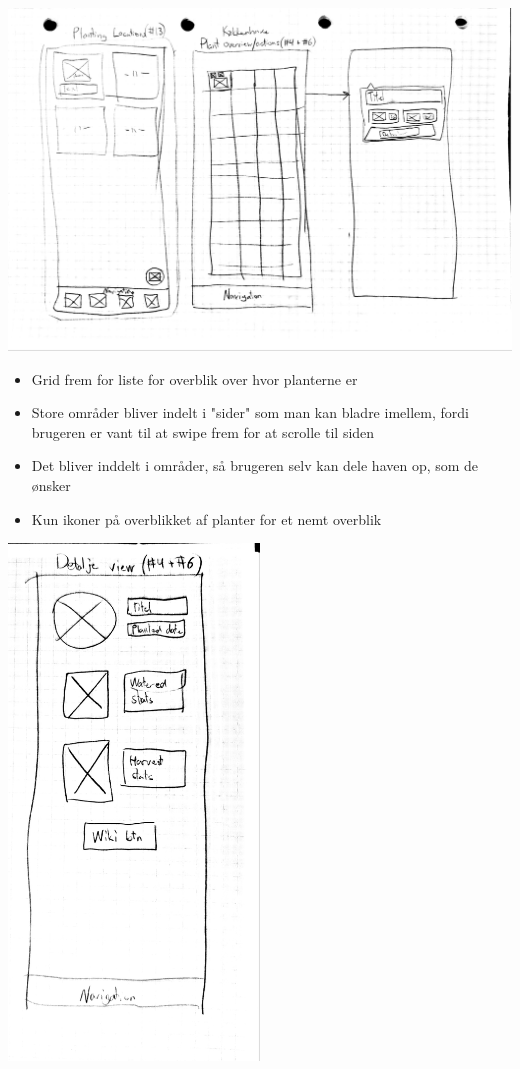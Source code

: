 \includegraphics[width=1\textwidth]{img/s1-4.jpg}\\

\begin{itemize}
    \item Grid frem for liste for overblik over hvor planterne er
    \item Store områder bliver indelt i "sider" som man kan bladre imellem, fordi brugeren er vant til at swipe frem for at scrolle til siden
    \item Det bliver inddelt i områder, så brugeren selv kan dele haven op, som de ønsker
    \item Kun ikoner på overblikket af planter for et nemt overblik
\end{itemize}

\includegraphics[width=0.5\textwidth]{img/s1-2.jpg}\\

